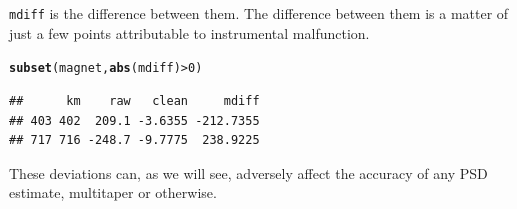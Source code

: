 \documentclass[10pt]{article}\usepackage[]{graphicx}\usepackage[]{color}
\makeatletter
\newcommand{\hlnum}[1]{\textcolor[rgb]{0.686,0.059,0.569}{#1}}%
\newcommand{\hlopt}[1]{\textcolor[rgb]{0,0,0}{#1}}%
\newcommand{\hlstd}[1]{\textcolor[rgb]{0.345,0.345,0.345}{#1}}%
\newcommand{\hlkwd}[1]{\textcolor[rgb]{0.737,0.353,0.396}{\textbf{#1}}}%
\newenvironment{kframe}{%
 \def\at@end@of@kframe{}%
 \ifinner\ifhmode%
  \def\at@end@of@kframe{\end{minipage}}%
  \begin{minipage}{\columnwidth}%
 \fi\fi%
 \def\FrameCommand##1{\hskip\@totalleftmargin \hskip-\fboxsep
 \colorbox{shadecolor}{##1}\hskip-\fboxsep
     \hskip-\linewidth \hskip-\@totalleftmargin \hskip\columnwidth}%
 \MakeFramed {\advance\hsize-\width
   \@totalleftmargin\z@ \linewidth\hsize
   \@setminipage}}%
 {\par\unskip\endMakeFramed%
 \at@end@of@kframe}
\newenvironment{knitrout}{}{} %
\newcommand{\Rcmd}[1]{\texttt{#1}}
\makeatother
\begin{document}
\Rcmd{mdiff} is the difference between them.
The difference between them is a matter of just a few points
attributable to instrumental malfunction. 
\begin{knitrout}
\color{fgcolor}\begin{kframe}
\begin{alltt}
\hlkwd{subset}\hlstd{(magnet,} \hlkwd{abs}\hlstd{(mdiff)}\hlopt{>}\hlnum{0}\hlstd{)}
\end{alltt}
\begin{verbatim}
##      km    raw   clean     mdiff
## 403 402  209.1 -3.6355 -212.7355
## 717 716 -248.7 -9.7775  238.9225
\end{verbatim}
\end{kframe}
\end{knitrout}
These deviations can,
as we will see, adversely affect the accuracy of any PSD estimate,
multitaper or otherwise.
\end{document}
